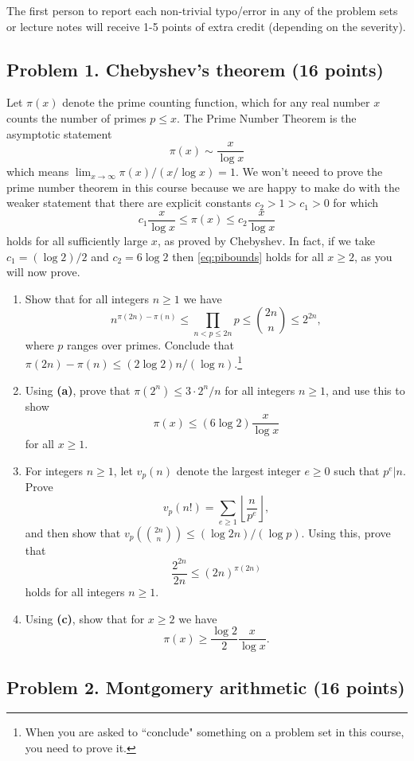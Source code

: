 \documentclass[11pt]{article}
\begin{document}
The first person to report each non-trivial typo/error in any of the problem sets or lecture notes will receive 1-5 points of extra credit (depending on the severity).

\subsection*{Problem 1. Chebyshev's theorem (16 points)}
Let $\pi(x)$ denote the prime counting function, which for any real number $x$ counts the number of primes $p\le x$.
The Prime Number Theorem is the asymptotic statement
\[
\pi(x)\sim \frac{x}{\log x}
\]
which means $\lim_{x\to\infty} \pi(x)/(x/\log x) = 1$.  We won't neeed to prove the prime number theorem in this course because we are happy to make do with the weaker statement that there are explicit constants $c_2 > 1 > c_1>0$ for which
\begin{equation}\label{eq:pibounds}
c_1\frac{x}{\log x}\le \pi(x)\le c_2\frac{x}{\log x}
\end{equation}
holds for all sufficiently large $x$, as proved by Chebyshev.
In fact, if we take $c_1=(\log 2)/2$ and $c_2=6\log 2$ then \eqref{eq:pibounds} holds for all $x\ge 2$, as you will now prove.
\begin{enumerate}
\item[\textbf{(a)}] Show that for all integers $n\ge 1$ we have
\[
n^{\pi(2n)-\pi(n)}\le \prod_{n<p\le 2n}p\le \binom{2n}{n}\le 2^{2n},
\]
where $p$ ranges over primes.  Conclude that $\pi(2n)-\pi(n)\le (2\log 2)n/(\log n)$.\footnote{When you are asked to ``conclude" something on a problem set in this course, you need to prove it.}
\item[\textbf{(b)}] Using \textbf{(a)}, prove that $\pi(2^n)\le 3\cdot 2^n/n$ for all integers $n\ge 1$, and use this to show
\[
\pi(x)\le (6\log 2)\frac{x}{\log x}
\]
for all $x\ge 1$.

\item[\textbf{(c)}] For integers $n\ge 1$, let $v_p(n)$ denote the largest integer $e\ge 0$ such that $p^e|n$.
Prove
\[
v_p(n!)=\sum_{e\ge 1} \left\lfloor \frac{n}{p^e}\right\rfloor,
\]
and then show that $v_p(\binom{2n}{n})\le (\log 2n)/(\log p)$.  Using this, prove that
\[
\frac{2^{2n}}{2n}\le (2n)^{\pi(2n)}
\]
holds for all integers $n\ge 1$.
\item[\textbf{(d)}] Using \textbf{(c)}, show that for $x\ge 2$ we have
\[
\pi(x) \ge \frac{\log 2}{2}\frac{x}{\log x}.
\]
\end{enumerate}

\subsection*{Problem 2. Montgomery arithmetic (16 points)}
\end{document}
